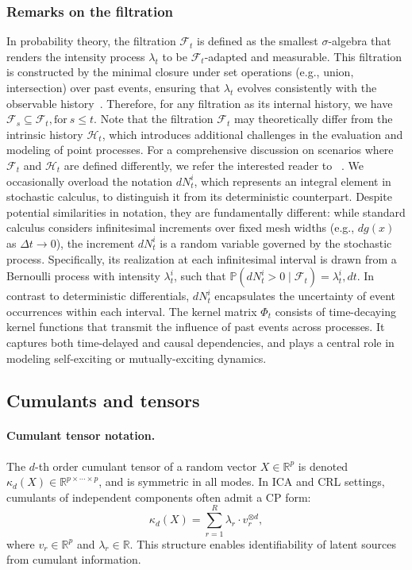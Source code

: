 \documentclass[10pt]{article}
\numberwithin{figure}{section}
\begin{document}
\subsubsection{Remarks on the filtration }\label{F}

In probability theory, the filtration $\mathcal{F}_t$ is defined as the smallest $\sigma$-algebra that renders the intensity process $\lambda_t$ to be $\mathcal{F}_t$-adapted and measurable. This filtration is constructed by the minimal closure under set operations (e.g., union, intersection) over past events, ensuring that $\lambda_t$ evolves consistently with the observable history~\citep{hawkes_spectra_1971,daley_introduction_2005}. Therefore, for any filtration as its internal history, we have $\mathcal{F}_s \subseteq \mathcal{F}_t,\text{for}\ s\le t$.  Note that the filtration $\mathcal{F}_t$ may theoretically differ from the intrinsic history $\mathcal{H}_t$, which introduces additional challenges in the evaluation and modeling of point processes. For a comprehensive discussion on scenarios where $\mathcal{F}_t$ and $\mathcal{H}_t$ are defined differently, we refer the interested reader to ~\citep{daley_introduction_2005}. We occasionally overload the notation $dN_t^i$, which represents an integral element in stochastic calculus, to distinguish it from its deterministic counterpart. Despite potential similarities in notation, they are fundamentally different: while standard calculus considers infinitesimal increments over fixed mesh widths (e.g., $dg(x)$ as $\Delta t \to 0$), the increment $dN_t^i$ is a random variable governed by the stochastic process. Specifically, its realization at each infinitesimal interval is drawn from a Bernoulli process with intensity $\lambda_t^i$, such that $\mathbb{P}(dN_t^i > 0 \mid \mathcal{F}_t) = \lambda_t^i , dt$. In contrast to deterministic differentials, $dN_t^i$ encapsulates the uncertainty of event occurrences within each interval. The kernel matrix $\Phi_t$ consists of time-decaying kernel functions that transmit the influence of past events across processes. It captures both time-delayed and causal dependencies, and plays a central role in modeling self-exciting or mutually-exciting dynamics.


\subsection{Cumulants and tensors}\label{app:preliminaries}

\paragraph{Cumulant tensor notation.}
The $d$-th order cumulant tensor of a random vector \( X \in \mathbb{R}^p \) is denoted \( \kappa_d(X) \in \mathbb{R}^{p \times \cdots \times p} \), and is symmetric in all modes. In ICA and CRL settings, cumulants of independent components often admit a CP form:
\[
\kappa_d(X) = \sum_{r=1}^{R} \lambda_r \cdot v_r^{\otimes d},
\]
where \( v_r \in \mathbb{R}^p \) and \( \lambda_r \in \mathbb{R} \). This structure enables identifiability of latent sources from cumulant information.
\end{document}
